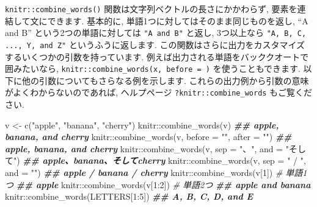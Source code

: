 \documentclass[
  11pt,
]{bxjsreport}
\newenvironment{Shaded}{\begin{snugshade}}{\end{snugshade}}
\newcommand{\AttributeTok}[1]{\textcolor[rgb]{0.77,0.63,0.00}{#1}}
\newcommand{\CommentTok}[1]{\textcolor[rgb]{0.56,0.35,0.01}{\textit{#1}}}
\newcommand{\DecValTok}[1]{\textcolor[rgb]{0.00,0.00,0.81}{#1}}
\newcommand{\DocumentationTok}[1]{\textcolor[rgb]{0.56,0.35,0.01}{\textbf{\textit{#1}}}}
\newcommand{\FunctionTok}[1]{\textcolor[rgb]{0.00,0.00,0.00}{#1}}
\newcommand{\NormalTok}[1]{#1}
\newcommand{\OtherTok}[1]{\textcolor[rgb]{0.56,0.35,0.01}{#1}}
\newcommand{\SpecialCharTok}[1]{\textcolor[rgb]{0.00,0.00,0.00}{#1}}
\newcommand{\StringTok}[1]{\textcolor[rgb]{0.31,0.60,0.02}{#1}}
\begin{document}
\texttt{knitr::combine\_words()} 関数は文字列ベクトルの長さにかかわらず, 要素を連結して文にできます. 基本的に, 単語1つに対してはそのまま同じものを返し, ``A and B'' という2つの単語に対しては \texttt{"A and B"} と返し, 3つ以上なら \texttt{"A, B, C, ..., Y, and Z"} というふうに返します. この関数はさらに出力をカスタマイズするいくつかの引数を持っています. 例えば出力される単語をバッククオートで囲みたいなら, \texttt{knitr::combine\_words(x, before = \textquotesingle{}\textasciigrave{}\textquotesingle{})} を使うこともできます. 以下に他の引数についてもさらなる例を示します. これらの出力例から引数の意味がよくわからないのであれば, ヘルプページ \texttt{?knitr::combine\_words} もご覧ください.

\begin{Shaded}
\begin{Highlighting}[numbers=left,,]
\NormalTok{v }\OtherTok{\textless{}{-}} \FunctionTok{c}\NormalTok{(}\StringTok{"apple"}\NormalTok{, }\StringTok{"banana"}\NormalTok{, }\StringTok{"cherry"}\NormalTok{)}
\NormalTok{knitr}\SpecialCharTok{::}\FunctionTok{combine\_words}\NormalTok{(v)}
\DocumentationTok{\#\# apple, banana, and cherry}
\NormalTok{knitr}\SpecialCharTok{::}\FunctionTok{combine\_words}\NormalTok{(v, }\AttributeTok{before =} \StringTok{"\textasciigrave{}"}\NormalTok{, }\AttributeTok{after =} \StringTok{"\textquotesingle{}"}\NormalTok{)}
\DocumentationTok{\#\# \textasciigrave{}apple\textquotesingle{}, \textasciigrave{}banana\textquotesingle{}, and \textasciigrave{}cherry\textquotesingle{}}
\NormalTok{knitr}\SpecialCharTok{::}\FunctionTok{combine\_words}\NormalTok{(v, }\AttributeTok{sep =} \StringTok{"、"}\NormalTok{, }\AttributeTok{and =} \StringTok{"そして"}\NormalTok{)}
\DocumentationTok{\#\# apple、banana、そしてcherry}
\NormalTok{knitr}\SpecialCharTok{::}\FunctionTok{combine\_words}\NormalTok{(v, }\AttributeTok{sep =} \StringTok{" / "}\NormalTok{, }\AttributeTok{and =} \StringTok{""}\NormalTok{)}
\DocumentationTok{\#\# apple / banana / cherry}
\NormalTok{knitr}\SpecialCharTok{::}\FunctionTok{combine\_words}\NormalTok{(v[}\DecValTok{1}\NormalTok{])  }\CommentTok{\# 単語1つ}
\DocumentationTok{\#\# apple}
\NormalTok{knitr}\SpecialCharTok{::}\FunctionTok{combine\_words}\NormalTok{(v[}\DecValTok{1}\SpecialCharTok{:}\DecValTok{2}\NormalTok{])  }\CommentTok{\# 単語2つ}
\DocumentationTok{\#\# apple and banana}
\NormalTok{knitr}\SpecialCharTok{::}\FunctionTok{combine\_words}\NormalTok{(LETTERS[}\DecValTok{1}\SpecialCharTok{:}\DecValTok{5}\NormalTok{])}
\DocumentationTok{\#\# A, B, C, D, and E}
\end{Highlighting}
\end{Shaded}
\end{document}
